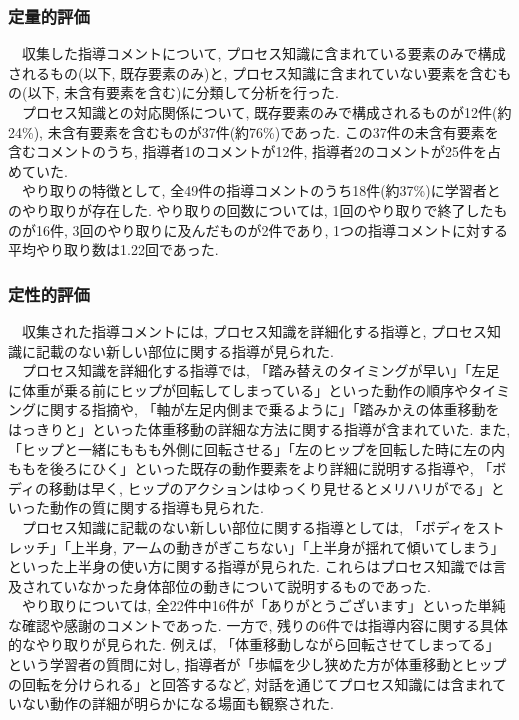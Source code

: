 \subsubsection{定量的評価}
　収集した指導コメントについて, プロセス知識に含まれている要素のみで構成されるもの(以下, 既存要素のみ)と, プロセス知識に含まれていない要素を含むもの(以下, 未含有要素を含む)に分類して分析を行った.\\
　プロセス知識との対応関係について, 既存要素のみで構成されるものが12件(約24\%), 未含有要素を含むものが37件(約76\%)であった. この37件の未含有要素を含むコメントのうち, 指導者1のコメントが12件, 指導者2のコメントが25件を占めていた.\\
　やり取りの特徴として, 全49件の指導コメントのうち18件(約37\%)に学習者とのやり取りが存在した. やり取りの回数については, 1回のやり取りで終了したものが16件, 3回のやり取りに及んだものが2件であり, 1つの指導コメントに対する平均やり取り数は1.22回であった.\\

\subsubsection{定性的評価}
　収集された指導コメントには, プロセス知識を詳細化する指導と, プロセス知識に記載のない新しい部位に関する指導が見られた.\\
　プロセス知識を詳細化する指導では, 「踏み替えのタイミングが早い」「左足に体重が乗る前にヒップが回転してしまっている」といった動作の順序やタイミングに関する指摘や, 「軸が左足内側まで乗るように」「踏みかえの体重移動をはっきりと」といった体重移動の詳細な方法に関する指導が含まれていた. また,「ヒップと一緒にももも外側に回転させる」「左のヒップを回転した時に左の内ももを後ろにひく」といった既存の動作要素をより詳細に説明する指導や, 「ボディの移動は早く, ヒップのアクションはゆっくり見せるとメリハリがでる」といった動作の質に関する指導も見られた.\\
　プロセス知識に記載のない新しい部位に関する指導としては, 「ボディをストレッチ」「上半身, アームの動きがぎこちない」「上半身が揺れて傾いてしまう」といった上半身の使い方に関する指導が見られた. これらはプロセス知識では言及されていなかった身体部位の動きについて説明するものであった.\\
　やり取りについては, 全22件中16件が「ありがとうございます」といった単純な確認や感謝のコメントであった. 一方で, 残りの6件では指導内容に関する具体的なやり取りが見られた. 例えば, 「体重移動しながら回転させてしまってる」という学習者の質問に対し, 指導者が「歩幅を少し狭めた方が体重移動とヒップの回転を分けられる」と回答するなど, 対話を通じてプロセス知識には含まれていない動作の詳細が明らかになる場面も観察された.\\

